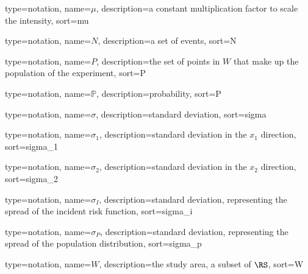{%
   type=notation,
   name={\ensuremath{\mu}},
   description={a constant multiplication factor to scale the intensity},
   sort={mu}
}

{%
   type=notation,
   name={\ensuremath{N}},
   description={a set of events},
   sort={N}
}

{%
   type=notation,
   name={\ensuremath{P}},
   description={the set of points in \ensuremath{W} that make up the population of the experiment},
   sort={P}
}

{%
   type=notation,
   name={\ensuremath{\mathbb{P}}},
   description={probability},
   sort={P}
}

{%
   type=notation,
   name={\ensuremath{\sigma}},
   description={standard deviation},
   sort={sigma}
}

{%
   type=notation,
   name={\ensuremath{\sigma_1}},
   description={standard deviation in the \ensuremath{x_1} direction},
   sort={sigma_1}
}

{%
   type=notation,
   name={\ensuremath{\sigma_2}},
   description={standard deviation in the \ensuremath{x_2} direction},
   sort={sigma_2}
}

{%
   type=notation,
   name={\ensuremath{\sigma_I}},
   description={standard deviation, representing the spread of the incident risk function},
   sort={sigma_i}
}

{%
   type=notation,
   name={\ensuremath{\sigma_P}},
   description={standard deviation, representing the spread of the population distribution},
   sort={sigma_p}
}

{%
   type=notation,
   name={\ensuremath{W}},
   description={the study area, a subset of \ensuremath{\RS}},
   sort={W}
}

